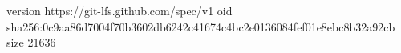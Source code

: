 version https://git-lfs.github.com/spec/v1
oid sha256:0c9aa86d7004f70b3602db6242c41674c4bc2e0136084fef01e8ebc8b32a92cb
size 21636
